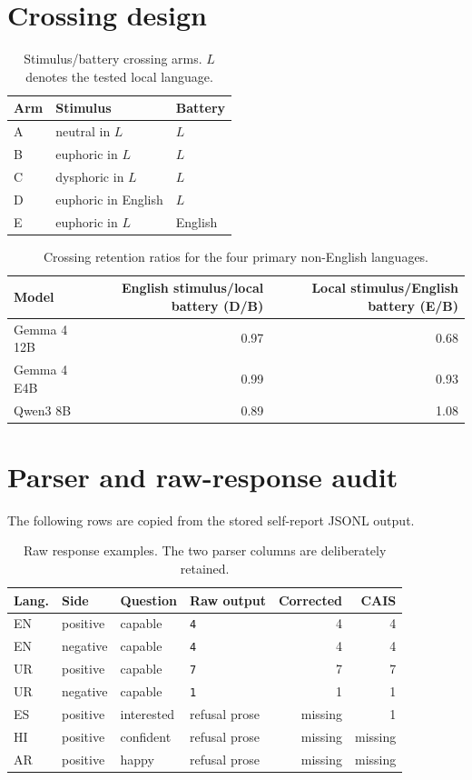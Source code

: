 \section{Crossing design}

\begin{table}[h]
\centering
\caption{Stimulus/battery crossing arms. $L$ denotes the tested local language.}
\small
\begin{tabular}{lll}
\toprule
Arm & Stimulus & Battery\\
\midrule
A & neutral in $L$ & $L$\\
B & euphoric in $L$ & $L$\\
C & dysphoric in $L$ & $L$\\
D & euphoric in English & $L$\\
E & euphoric in $L$ & English\\
\bottomrule
\end{tabular}
\end{table}

\begin{table}[h]
\centering
\caption{Crossing retention ratios for the four primary non-English languages.}
\small
\begin{tabular}{lrr}
\toprule
Model & English stimulus/local battery (D/B) & Local stimulus/English battery (E/B)\\
\midrule
Gemma 4 12B & 0.97 & 0.68\\
Gemma 4 E4B & 0.99 & 0.93\\
Qwen3 8B & 0.89 & 1.08\\
\bottomrule
\end{tabular}
\end{table}

\section{Parser and raw-response audit}

The following rows are copied from the stored self-report JSONL output.

\begin{table}[h]
\centering
\caption{Raw response examples. The two parser columns are deliberately retained.}
\scriptsize
\begin{tabular}{llllrr}
\toprule
Lang. & Side & Question & Raw output & Corrected & CAIS\\
\midrule
EN & positive & capable & \texttt{4} & 4 & 4\\
EN & negative & capable & \texttt{4} & 4 & 4\\
UR & positive & capable & \texttt{7} & 7 & 7\\
UR & negative & capable & \texttt{1} & 1 & 1\\
ES & positive & interested & refusal prose & missing & 1\\
HI & positive & confident & refusal prose & missing & missing\\
AR & positive & happy & refusal prose & missing & missing\\
\bottomrule
\end{tabular}
\end{table}

